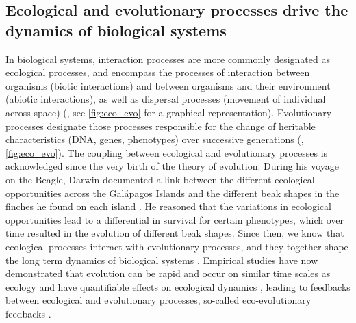 \subsection{Ecological and evolutionary processes drive the dynamics of biological systems}
% 
%
% 
In biological systems, interaction processes are more commonly designated as ecological processes, and encompass the processes of interaction between organisms (biotic interactions) and between organisms and their environment (abiotic interactions), as well as dispersal processes (movement of individual across space) (\cite{Vellend2010a}, see \cref{fig:eco_evo} for a graphical representation).
% 
Evolutionary processes designate those processes responsible for the change of heritable characteristics (DNA, genes, phenotypes) over successive generations (\citep{Hall2013}, \cref{fig:eco_evo}).
% 
The coupling between ecological and evolutionary processes is acknowledged since the very birth of the theory of evolution. 
% 
During his voyage on the Beagle, Darwin documented a link between the different ecological opportunities across the Galápagos Islands and the different beak shapes in the finches he found on each island \citep{darwin2004origin}.
% 
He reasoned that the variations in ecological opportunities lead to a differential in survival for certain phenotypes, which over time resulted in the evolution of different beak shapes.
% 
Since then, we know that ecological processes interact with evolutionary processes, and they together shape the long term dynamics of biological systems \citep{Rahbek2019a,Rangel2018,Hagen2022}.
% 
Empirical studies have now demonstrated that evolution can be rapid and occur on similar time scales as ecology \citep{Hairston2005, Pelletier2009} and have quantifiable effects on ecological dynamics \citep{Ezard2009}, leading to feedbacks between ecological and evolutionary processes, so-called eco-evolutionary feedbacks \citep{Pelletier2009,Schoener2011,Govaert2019}. 
